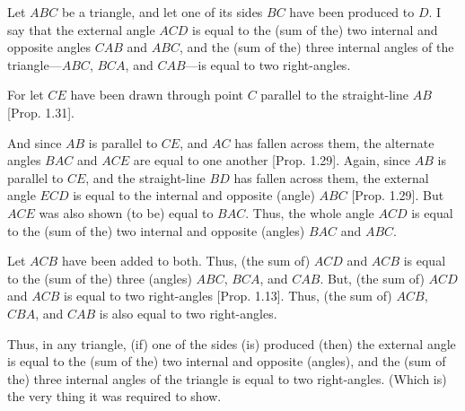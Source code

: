 \begin{Parallel}{}{}
{\epsfysize=2in
\centerline{}

Let $ABC$ be a triangle, and let one of its sides $BC$ have been produced to $D$.
I say that the external angle $ACD$ is equal to the (sum of the) two internal and opposite
angles $CAB$ and $ABC$, and the (sum of the) three internal angles of the triangle---$ABC$, $BCA$, and $CAB$---is equal to two right-angles.

For let $CE$ have been drawn through point $C$ parallel to the straight-line
$AB$ [Prop. 1.31].

And since $AB$ is parallel to $CE$, and $AC$ has fallen across them, the alternate
angles $BAC$ and $ACE$ are equal to one another [Prop. 1.29]. Again,
since $AB$ is parallel to $CE$, and the straight-line $BD$ has fallen across them, 
the external angle $ECD$ is equal to the internal and opposite (angle)
$ABC$ [Prop. 1.29]. But $ACE$ was also shown (to be) equal to $BAC$. Thus, the whole
angle $ACD$ is equal to the (sum of the) two internal and opposite (angles) $BAC$ and $ABC$.

Let $ACB$ have been added to both. Thus, (the sum of) $ACD$ and $ACB$ is equal to
the (sum of the) three (angles) $ABC$, $BCA$, and $CAB$. But, (the sum of) $ACD$ and $ACB$ is equal
to two right-angles [Prop. 1.13]. Thus, (the sum of) $ACB$, $CBA$, and $CAB$ is also
equal to two right-angles.

Thus, in any triangle,  (if) one of the sides  (is) produced (then) the external
angle is equal to the (sum of the) two internal and opposite (angles), and the (sum of the) three
internal angles of the triangle is equal to two right-angles. (Which is)
the very thing it was required to show.}
\end{Parallel}

